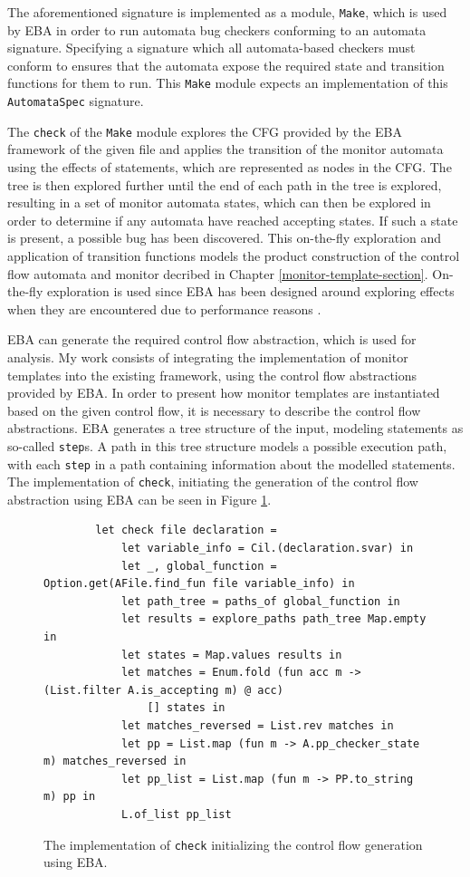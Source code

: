 \newpar The aforementioned signature is implemented as a module, \texttt{Make}, which is used by EBA in order to run automata bug checkers conforming to an automata signature. Specifying a signature which all automata-based checkers must conform to ensures that the automata expose the required state and transition functions for them to run. This \texttt{Make} module expects an implementation of this \texttt{AutomataSpec} signature. 

\newpar The \texttt{check} of the \texttt{Make} module explores the CFG provided by the EBA framework of the given file and applies the transition of the monitor automata using the effects of statements, which are represented as nodes in the CFG. The tree is then explored further until the end of each path in the tree is explored, resulting in a set of monitor automata states, which can then be explored in order to determine if any automata have reached accepting states. If such a state is present, a possible bug has been discovered. This on-the-fly exploration and application of transition functions models the product construction of the control flow automata and monitor decribed in Chapter \ref{monitor-template-section}. On-the-fly exploration is used since EBA has been designed around exploring effects when they are encountered due to performance reasons \cite{Abal2017EffectiveBF}. 

\newpar EBA can generate the required control flow abstraction, which is used for analysis. My work consists of integrating the implementation of monitor templates into the existing framework, using the control flow abstractions provided by EBA. In order to present how monitor templates are instantiated based on the given control flow, it is necessary to describe the control flow abstractions. EBA generates a tree structure of the input, modeling statements as so-called \texttt{step}s. A path in this tree structure models a possible execution path, with each \texttt{step} in a path containing information about the modelled statements. The implementation of \texttt{check}, initiating the generation of the control flow abstraction using EBA can be seen in Figure \ref{check-implementation}. 

\begin{figure}[H]
    \centering
    \begin{verbatim}
        let check file declaration =
            let variable_info = Cil.(declaration.svar) in
            let _, global_function = Option.get(AFile.find_fun file variable_info) in
            let path_tree = paths_of global_function in
            let results = explore_paths path_tree Map.empty in 
            let states = Map.values results in
            let matches = Enum.fold (fun acc m -> (List.filter A.is_accepting m) @ acc) 
                [] states in
            let matches_reversed = List.rev matches in 
            let pp = List.map (fun m -> A.pp_checker_state m) matches_reversed in
            let pp_list = List.map (fun m -> PP.to_string m) pp in
            L.of_list pp_list
    \end{verbatim}
    \caption{The implementation of \texttt{check} initializing the control flow generation using EBA.}
    \label{check-implementation}
\end{figure}

